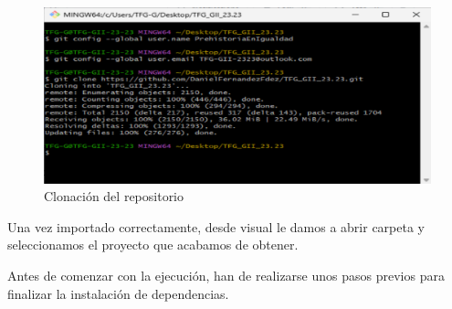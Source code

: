 \begin{itemize}
    \begin{figure}[h]
        \centering
        \includegraphics[width=0.75\linewidth]{Imagenes/GitClone.png}
        \caption{Clonación del repositorio}
        \label{Clonación del repositorio}
    \end{figure}
    \FloatBarrier
\end{itemize}


Una vez importado correctamente, desde visual le damos a abrir carpeta y seleccionamos el proyecto que acabamos de obtener.

Antes de comenzar con la ejecución, han de realizarse unos pasos previos para finalizar la instalación de dependencias.

